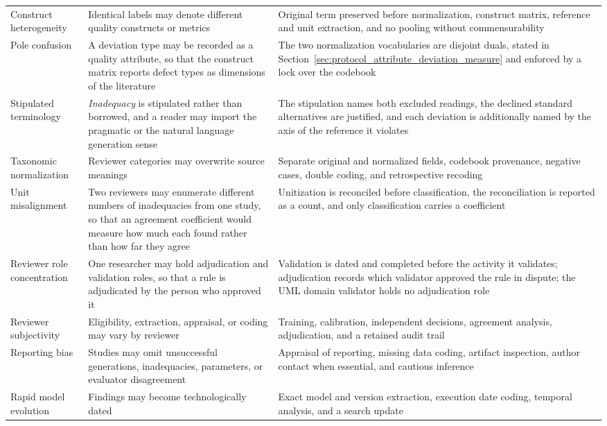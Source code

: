 \begin{longtable}{p{} p{} p{}}
Construct heterogeneity & Identical labels may denote different quality constructs or metrics & Original term preserved before normalization, construct matrix, reference and unit extraction, and no pooling without commensurability \\
Pole confusion & A deviation type may be recorded as a quality attribute, so that the construct matrix reports defect types as dimensions of the literature & The two normalization vocabularies are disjoint duals, stated in Section~\ref{sec:protocol_attribute_deviation_measure} and enforced by a lock over the codebook \\
Stipulated terminology & \textit{Inadequacy} is stipulated rather than borrowed, and a reader may import the pragmatic or the natural language generation sense & The stipulation names both excluded readings, the declined standard alternatives are justified, and each deviation is additionally named by the axis of the reference it violates \\
Taxonomic normalization & Reviewer categories may overwrite source meanings & Separate original and normalized fields, codebook provenance, negative cases, double coding, and retrospective recoding \\
Unit misalignment & Two reviewers may enumerate different numbers of inadequacies from one study, so that an agreement coefficient would measure how much each found rather than how far they agree & Unitization is reconciled before classification, the reconciliation is reported as a count, and only classification carries a coefficient \\
Reviewer role concentration & One researcher may hold adjudication and validation roles, so that a rule is adjudicated by the person who approved it & Validation is dated and completed before the activity it validates; adjudication records which validator approved the rule in dispute; the UML domain validator holds no adjudication role \\
Reviewer subjectivity & Eligibility, extraction, appraisal, or coding may vary by reviewer & Training, calibration, independent decisions, agreement analysis, adjudication, and a retained audit trail \\
Reporting bias & Studies may omit unsuccessful generations, inadequacies, parameters, or evaluator disagreement & Appraisal of reporting, missing data coding, artifact inspection, author contact when essential, and cautious inference \\
Rapid model evolution & Findings may become technologically dated & Exact model and version extraction, execution date coding, temporal analysis, and a search update \\

\end{longtable}
